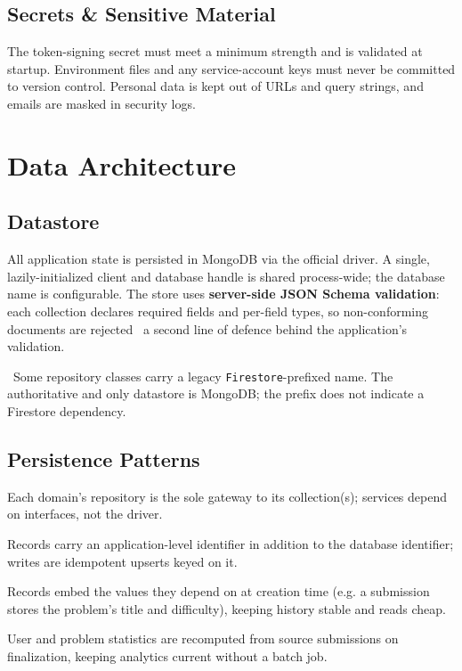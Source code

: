 \documentclass[12pt,a4paper,oneside]{report}
\newcommand{\code}[1]{\texttt{#1}}
\newcommand{\note}[1]{\par\vspace{3pt}\noindent{\color{tcetaccent}\textbf{Note.}}~#1\par\vspace{3pt}}
\begin{document}
\section{Secrets \& Sensitive Material}
The token-signing secret must meet a minimum strength and is validated at
startup. Environment files and any service-account keys must never be committed
to version control. Personal data is kept out of URLs and query strings, and
emails are masked in security logs.

\chapter{Data Architecture}
\section{Datastore}
All application state is persisted in MongoDB via the official driver. A single,
lazily-initialized client and database handle is shared process-wide; the
database name is configurable. The store uses \textbf{server-side JSON Schema
validation}: each collection declares required fields and per-field types, so
non-conforming documents are rejected \textemdash\ a second line of defence
behind the application's validation.

\note{Some repository classes carry a legacy \code{Firestore}-prefixed name. The
authoritative and only datastore is MongoDB; the prefix does not indicate a
Firestore dependency.}

\section{Persistence Patterns}
\begin{description}[leftmargin=1.6em,style=nextline]
  \item[Repository per domain] Each domain's repository is the sole gateway to
        its collection(s); services depend on interfaces, not the driver.
  \item[Stable application identifiers] Records carry an application-level
        identifier in addition to the database identifier; writes are idempotent
        upserts keyed on it.
  \item[Denormalized snapshots] Records embed the values they depend on at
        creation time (e.g. a submission stores the problem's title and
        difficulty), keeping history stable and reads cheap.
  \item[Recomputed aggregates] User and problem statistics are recomputed from
        source submissions on finalization, keeping analytics current without a
        batch job.
\end{description}
\end{document}
